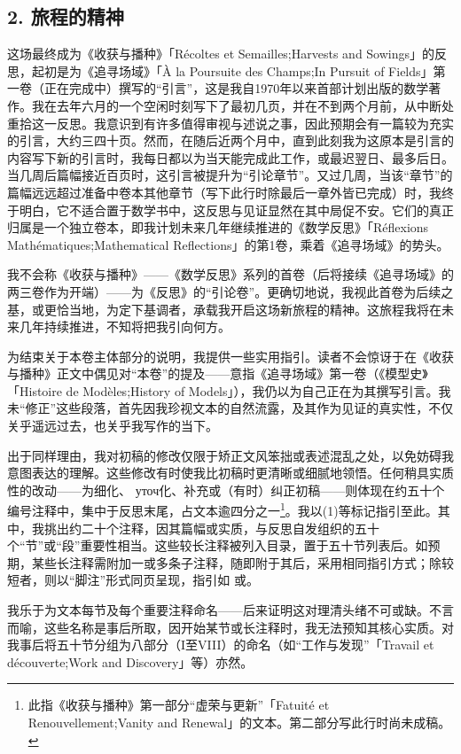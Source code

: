 \subsection{2. 旅程的精神}

这场最终成为《收获与播种》「Récoltes et Semailles;Harvests and Sowings」的反思，起初是为《追寻场域》「À la Poursuite des Champs;In Pursuit of Fields」第一卷（正在完成中）撰写的“引言”，这是我自1970年以来首部计划出版的数学著作。我在去年六月的一个空闲时刻写下了最初几页，并在不到两个月前，从中断处重拾这一反思。我意识到有许多值得审视与述说之事，因此预期会有一篇较为充实的引言，大约三四十页。然而，在随后近两个月中，直到此刻我为这原本是引言的内容写下新的引言时，我每日都以为当天能完成此工作，或最迟翌日、最多后日。当几周后篇幅接近百页时，这引言被提升为“引论章节”。又过几周，当该“章节”的篇幅远远超过准备中卷本其他章节（写下此行时除最后一章外皆已完成）时，我终于明白，它不适合置于数学书中，这反思与见证显然在其中局促不安。它们的真正归属是一个独立卷本，即我计划未来几年继续推进的《数学反思》「Réflexions Mathématiques;Mathematical Reflections」的第1卷，乘着《追寻场域》的势头。

我不会称《收获与播种》——《数学反思》系列的首卷（后将接续《追寻场域》的两三卷作为开端）——为《反思》的“引论卷”。更确切地说，我视此首卷为后续之基，或更恰当地，为定下基调者，承载我开启这场新旅程的精神。这旅程我将在未来几年持续推进，不知将把我引向何方。

为结束关于本卷主体部分的说明，我提供一些实用指引。读者不会惊讶于在《收获与播种》正文中偶见对“本卷”的提及——意指《追寻场域》第一卷（《模型史》「Histoire de Modèles;History of Models」），我仍以为自己正在为其撰写引言。我未“修正”这些段落，首先因我珍视文本的自然流露，及其作为见证的真实性，不仅关乎遥远过去，也关乎我写作的当下。

出于同样理由，我对初稿的修改仅限于矫正文风笨拙或表述混乱之处，以免妨碍我意图表达的理解。这些修改有时使我比初稿时更清晰或细腻地领悟。任何稍具实质性的改动——为细化、 уточ化、补充或（有时）纠正初稿——则体现在约五十个编号注释中，集中于反思末尾，占文本逾四分之一\footnote{此指《收获与播种》第一部分“虚荣与更新”「Fatuité et Renouvellement;Vanity and Renewal」的文本。第二部分写此行时尚未成稿。}。我以(1)等标记指引至此。其中，我挑出约二十个注释，因其篇幅或实质，与反思自发组织的五十个“节”或“段”重要性相当。这些较长注释被列入目录，置于五十节列表后。如预期，某些长注释需附加一或多条子注释，随即附于其后，采用相同指引方式；除较短者，则以“脚注”形式同页呈现，指引如 或。

我乐于为文本每节及每个重要注释命名——后来证明这对理清头绪不可或缺。不言而喻，这些名称是事后所取，因开始某节或长注释时，我无法预知其核心实质。对我事后将五十节分组为八部分（I至VIII）的命名（如“工作与发现”「Travail et découverte;Work and Discovery」等）亦然。

